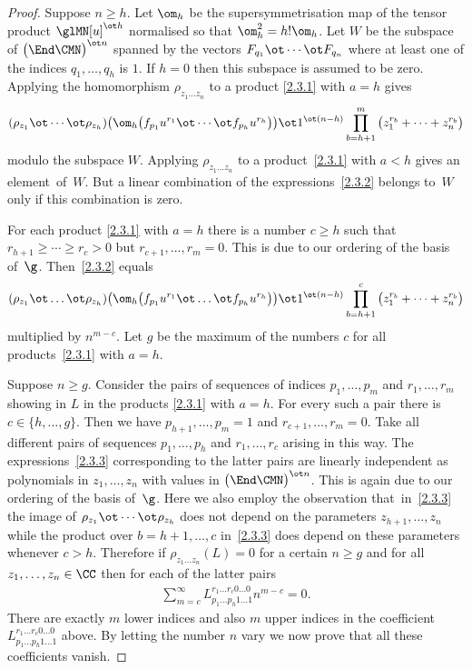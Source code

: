 \begin{proof}
Suppose $n\ge h $.
Let $\om_{h}$ be the supersymmetrisation map of
the tensor product $\glMN[u]^{\ot h}$ normalised so that
$\om_{h}^{2}=h ! \om_{h} $.
Let $W$ be the subspace
of $\big(\End\CMN\big)^{\ot n}$ spanned by the vectors
$F_{q_{1}}\ot\cdots\ot F_{q_{n}}$
where at least one
of the indices $q_{1},\dots, q_{h}$ is $1 $.
If $h=0$ then this subspace is assumed to be zero.
Applying the homomorphism
$\rho_{z_1\dots z_n}$ to a product \eqref{2.3.1}
with $a=h$ gives
\begin{gather}\label{2.3.2}
( \rho_{z_1}\ot\cdots\ot\rho_{z_{h}} )
\big( \om_{h}
\big( f_{p_1}u^{r_1}
\ot\cdots\ot
f_{p_{h}}u^{r_h} \big) \big)
\ot1^{\ot (n-h)}
\prod_{b=h+1}^m
\big( z_1^{r_b}+\dots+z_n^{r_b} \big)
\end{gather}
modulo the subspace $W$. Applying
$\rho_{z_1\dots z_n}$ to a product~\eqref{2.3.1}
with $a<h$ gives an element~of~$W$.
But a linear combination of the
expressions~\eqref{2.3.2} belongs to~$W$
only if this combination is zero.

For each product \eqref{2.3.1} with $a=h$
there is a number $c\ge h$ such that $r_{h+1}\ge\cdots\ge r_c>0$
but $r_{c+1} ,\dots, r_m=0 $.
This is due to our ordering of the basis of~$\g $.
Then~\eqref{2.3.2} equals
\begin{gather}\label{2.3.3}
( \rho_{z_1}\ot\dots\ot\rho_{z_{h}} )
\big( \om_{h}
\big( f_{p_1}u^{r_1}
\ot\dots\ot
f_{p_{h}}u^{r_h} \big) \big)
\ot1^{\ot (n-h)}
\prod_{b=h+1}^c
\big( z_1^{r_b}+\dots+z_n^{r_b} \big)
\end{gather}
multiplied by $n^{m-c}$.
Let $g$ be the maximum of the numbers $c$
for all products~\eqref{2.3.1} with $a=h $.

Suppose $n\ge g$. Consider the pairs of sequences of indices
$p_1,\dots, p_{m}$ and $r_1,\dots, r_m$
showing in $L$ in the products \eqref{2.3.1}
with $a=h$. For every such a pair there is
$c\in\{h,\dots, g \}$.
Then we have
$p_{h+1},\dots, p_{m}=1$ and $r_{c+1},\dots, r_m=0$.
Take all different pairs of sequences $p_1,\dots, p_{h}$ and $r_1,\dots, r_c$
arising in this way.
The expressions~\eqref{2.3.3} corresponding to the latter pairs
are linearly independent as polynomials in $z_1,\dots, z_n$
with values in $\big(\End\CMN\big)^{\ot n}$.
This is again due to our ordering of the basis of~$\g$.
Here we also employ the observation that~in~\eqref{2.3.3} the image of
$\rho_{z_1}\ot\cdots\ot\rho_{z_{h}}$
does not depend on the parameters $z_{h+1},\dots, z_n$
while the product over $b=h+1,\dots, c$ in~\eqref{2.3.3}
does depend on these parameters whenever $c>h$.
Therefore if $\rho_{z_1\ldots z_n}(L)=0$ for a certain $n\ge g$
and for all $z_1,\dots, z_n\in\CC$ then for each of the latter pairs
\begin{gather*}
\sum_{m=c}^\infty
L_{p_1\ldots p_h 1\ldots 1}^{r_1\ldots r_c 0\ldots 0} n^{m-c}=0.
\end{gather*}
There are exactly $m$ lower indices and also $m$ upper indices
in the coefficient
$L_{p_1\ldots p_h 1\ldots 1}^{r_1\ldots r_c 0\ldots 0}$ above.
By letting the number $n$ vary we now prove that all these
coefficients vanish.
\end{proof}

